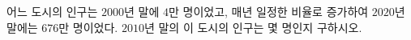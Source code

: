 어느 도시의 인구는 $2000$년 말에 $4$만 명이었고, 매년 일정한 비율로 증가하여 $2020$년 말에는 $676$만 명이었다. $2010$년 말의 이 도시의 인구는 몇 명인지 구하시오.
